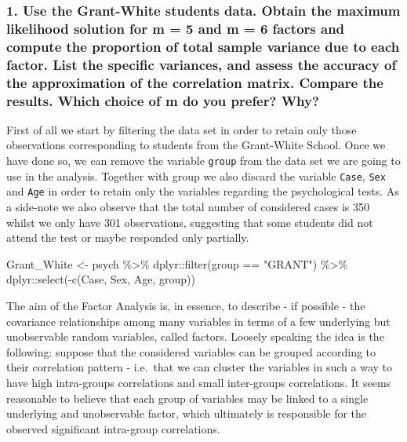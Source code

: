 \documentclass[
  letterpaper,
  DIV=11,
  numbers=noendperiod]{scrartcl}
\newenvironment{Shaded}{\begin{snugshade}}{\end{snugshade}}
\newcommand{\FunctionTok}[1]{\textcolor[rgb]{0.28,0.35,0.67}{#1}}
\newcommand{\NormalTok}[1]{\textcolor[rgb]{0.00,0.23,0.31}{#1}}
\newcommand{\OtherTok}[1]{\textcolor[rgb]{0.00,0.23,0.31}{#1}}
\newcommand{\SpecialCharTok}[1]{\textcolor[rgb]{0.37,0.37,0.37}{#1}}
\newcommand{\StringTok}[1]{\textcolor[rgb]{0.13,0.47,0.30}{#1}}
\begin{document}
\hypertarget{use-the-grant-white-students-data.-obtain-the-maximum-likelihood-solution-for-m-5-and-m-6-factors-and-compute-the-proportion-of-total-sample-variance-due-to-each-factor.-list-the-specific-variances-and-assess-the-accuracy-of-the-approximation-of-the-correlation-matrix.-compare-the-results.-which-choice-of-m-do-you-prefer-why}{%
\subsubsection{1. Use the Grant-White students data. Obtain the maximum
likelihood solution for m = 5 and m = 6 factors and compute the
proportion of total sample variance due to each factor. List the
specific variances, and assess the accuracy of the approximation of the
correlation matrix. Compare the results. Which choice of m do you
prefer?
Why?}\label{use-the-grant-white-students-data.-obtain-the-maximum-likelihood-solution-for-m-5-and-m-6-factors-and-compute-the-proportion-of-total-sample-variance-due-to-each-factor.-list-the-specific-variances-and-assess-the-accuracy-of-the-approximation-of-the-correlation-matrix.-compare-the-results.-which-choice-of-m-do-you-prefer-why}}

First of all we start by filtering the data set in order to retain only
those observations corresponding to students from the Grant-White
School. Once we have done so, we can remove the variable \texttt{group}
from the data set we are going to use in the analysis. Together with
group we also discard the variable \texttt{Case}, \texttt{Sex} and
\texttt{Age} in order to retain only the variables regarding the
psychological tests. As a side-note we also observe that the total
number of considered cases is 350 whilst we only have 301 observations,
suggesting that some students did not attend the test or maybe responded
only partially.

\begin{Shaded}
\begin{Highlighting}[]
\NormalTok{Grant\_White }\OtherTok{\textless{}{-}}\NormalTok{ psych }\SpecialCharTok{\%\textgreater{}\%}\NormalTok{ dplyr}\SpecialCharTok{::}\FunctionTok{filter}\NormalTok{(group }\SpecialCharTok{==} \StringTok{"GRANT"}\NormalTok{) }\SpecialCharTok{\%\textgreater{}\%}
\NormalTok{dplyr}\SpecialCharTok{::}\FunctionTok{select}\NormalTok{(}\SpecialCharTok{{-}}\FunctionTok{c}\NormalTok{(Case, Sex, Age, group))}
\end{Highlighting}
\end{Shaded}

The aim of the Factor Analysis is, in essence, to describe - if possible
- the covariance relationships among many variables in terms of a few
underlying but unobservable random variables, called factors. Loosely
speaking the idea is the following: suppose that the considered
variables can be grouped according to their correlation pattern -
i.e.~that we can cluster the variables in such a way to have high
intra-groups correlations and small inter-groups correlations. It seems
reasonable to believe that each group of variables may be linked to a
single underlying and unobservable factor, which ultimately is
responsible for the observed significant intra-group correlations.
\end{document}
